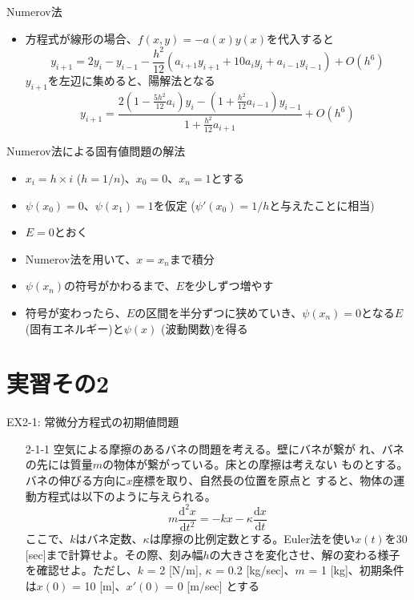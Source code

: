 \documentclass[dvipdfmx]{beamer}
\begin{document}
\begin{frame}[t,fragile]{Numerov法}
  \begin{itemize}
    \setlength{\itemsep}{1em}
  \item 方程式が線形の場合、$f(x,y) = -a(x) y(x)$を代入すると
    \[
    y_{i+1} = 2y_i - y_{i-1} - \frac{h^2}{12} (a_{i+1}y_{i+1} + 10a_{i}y_{i} + a_{i-1}y_{i-1}) + O(h^6)
    \]
  $y_{i+1}$を左辺に集めると、陽解法となる
    \[
    y_{i+1} = \frac{2 (1-\frac{5h^2}{12} a_i)y_i - (1 + \frac{h^2}{12} a_{i-1}) y_{i-1}}{1 + \frac{h^2}{12} a_{i+1}} + O(h^6)
    \]
  \end{itemize}
\end{frame}

\begin{frame}[t,fragile]{Numerov法による固有値問題の解法}
  \begin{itemize}
    \setlength{\itemsep}{1em}
  \item $x_i=h \times i$ ($h=1/n$)、$x_0=0$、$x_n=1$とする
  \item $\psi(x_0)=0$、$\psi(x_1) = 1$を仮定 ($\psi'(x_0)=1/h$と与えたことに相当)
  \item $E = 0$とおく
  \item Numerov法を用いて、$x=x_n$まで積分
  \item $\psi(x_n)$の符号がかわるまで、$E$を少しずつ増やす
  \item 符号が変わったら、$E$の区間を半分ずつに狭めていき、$\psi(x_n)=0$となる$E$ (固有エネルギー)と$\psi(x)$ (波動関数)を得る
  \end{itemize}
\end{frame}

\section{実習その2}

\begin{frame}[t,fragile]{EX2-1: 常微分方程式の初期値問題}
  \begin{itemize}
    \setlength{\itemsep}{1em}
  \item[2-1-1] 空気による摩擦のあるバネの問題を考える。壁にバネが繋が
    れ、バネの先には質量$m$の物体が繋がっている。床との摩擦は考えない
    ものとする。バネの伸びる方向に$x$座標を取り、自然長の位置を原点と
    すると、物体の運動方程式は以下のように与えられる。
    \[
    m\frac{\mathrm{d} ^2x}{\mathrm{d} t^2} = -kx - \kappa \frac{\mathrm{d} x}{\mathrm{d} t} 
    \]
    ここで、$k$はバネ定数、$\kappa$は摩擦の比例定数とする。Euler法を使い$x(t)$を30 [sec]まで計算せよ。その際、刻み幅$h$の大きさを変化させ、解の変わる様子を確認せよ。ただし、$k$ = 2 [N/m], $\kappa$ = 0.2 [kg/sec]、$m$ = 1 [kg]、初期条件は$x(0)$ = 10 [m]、$x'(0)$ = 0 [m/sec] とする
  \end{itemize}
\end{frame}
\end{document}
